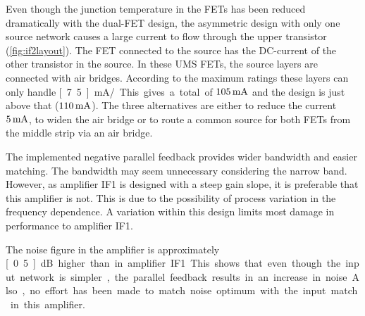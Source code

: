 			Even though the junction temperature in the FETs has been reduced dramatically with the dual-FET design, the asymmetric design with only one source network causes a large current to flow through the upper transistor (\autoref{fig:if2layout}). The FET connected to the source has the DC-current of the other transistor in the source. In these UMS FETs, the source layers are connected with \unit[14]{\mum} air bridges. According to the maximum ratings these layers can only handle \unit[7.5]{mA/\mum}. This gives a total of $\unit[105]{mA}$ and the design is just above that ($\unit[110]{mA}$). The three alternatives are either to reduce the current $\unit[5]{mA}$, to widen the air bridge \unit[1]{\mum} or to route a common source for both FETs from the middle strip via an air bridge.

			The implemented negative parallel feedback provides wider bandwidth and easier matching. The bandwidth may seem unnecessary considering the narrow band. However, as amplifier IF1 is designed with a steep gain slope, it is preferable that this amplifier is not. This is due to the possibility of process variation in the frequency dependence. A variation within this design limits most damage in performance to amplifier IF1.

			The noise figure in the amplifier is approximately \unit[0.5]{dB} higher than in amplifier IF1. This shows that even though the input network is simpler, the parallel feedback results in an increase in noise. Also, no effort has been made to match noise optimum with the input match in this amplifier.


